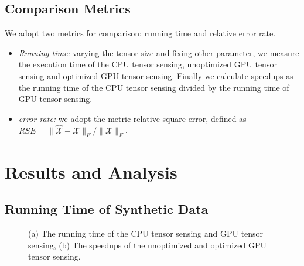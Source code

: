 \documentclass[futureinternet,article,submit,moreauthors,pdftex,10pt,a4paper]{Definitions/mdpi}
\theoremstyle{plain}
\theoremstyle{definition}
\theoremstyle{remark}
\begin{document}
\subsection{Comparison Metrics}
We adopt two metrics for comparison: running time and relative error rate.
\begin{itemize}
    \item \textit{Running time:} varying the tensor size and fixing other parameter, we measure the execution time of the CPU tensor sensing, unoptimized GPU tensor sensing and optimized GPU tensor sensing. Finally we calculate speedups as the running time of the CPU tensor sensing divided by the running time of GPU tensor sensing.
    \item \textit{error rate:} we adopt the metric relative square error, defined as $ RSE = \| \widehat{\mathcal{X}} - \mathcal{X} \|_F / \|\mathcal{X} \|_F $.
\end{itemize}

\section{Results and Analysis}
\label{SEC_RESULT}
\subsection{Running Time of Synthetic Data}
\begin{figure}[t]
    \centering
\caption{(a) The running time of the CPU tensor sensing and GPU tensor sensing, (b) The speedups of the unoptimized and optimized GPU tensor sensing.}
\end{figure}
\end{document}
